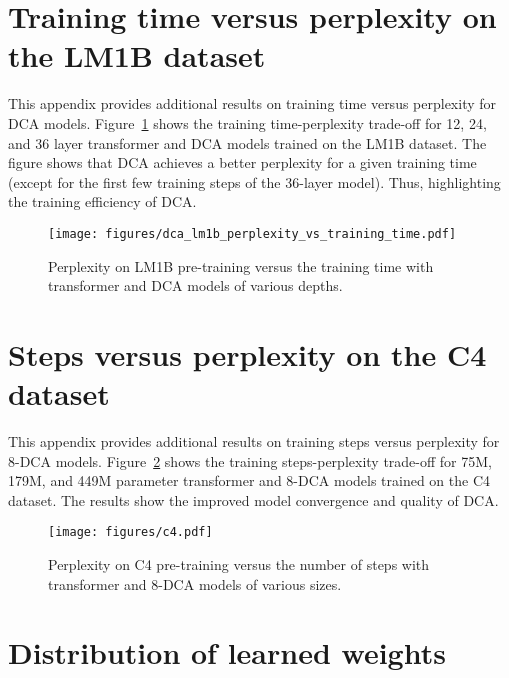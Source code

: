 \clearpage
\section{Training time versus perplexity on the LM1B dataset}
\label{app:training-time-vs-perplexity}

This appendix provides additional results on training time versus perplexity for DCA models. Figure~\ref{fig:perplexity_vs_training_time} shows the training time-perplexity trade-off for 12, 24, and 36 layer transformer and DCA models trained on the LM1B dataset. The figure shows that DCA achieves a better perplexity for a given training time (except for the first few training steps of the 36-layer model). Thus, highlighting the training efficiency of DCA.

\begin{figure}[h]
    \centering
    \texttt{[image: figures/dca\_lm1b\_perplexity\_vs\_training\_time.pdf]}
    \vskip -0.1in
    \caption{Perplexity on LM1B pre-training versus the training time with transformer and DCA models of various depths.}
    \label{fig:perplexity_vs_training_time}
\end{figure}

\section{Steps versus perplexity on the C4 dataset}
\label{app:steps-vs-perplexity}

This appendix provides additional results on training steps versus perplexity for 8-DCA models. Figure~\ref{fig:c4_perplexity_vs_steps} shows the training steps-perplexity trade-off for 75M, 179M, and 449M parameter transformer and 8-DCA models trained on the C4 dataset. The results show the improved model convergence and quality of DCA.

\begin{figure}[h]
    \centering
    \texttt{[image: figures/c4.pdf]}
    \vskip -0.1in
    \caption{Perplexity on C4 pre-training versus the number of steps with transformer and 8-DCA models of various sizes.}
    \label{fig:c4_perplexity_vs_steps}
\end{figure}

\clearpage
\section{Distribution of learned weights}
\label{app:weight-distribution}

